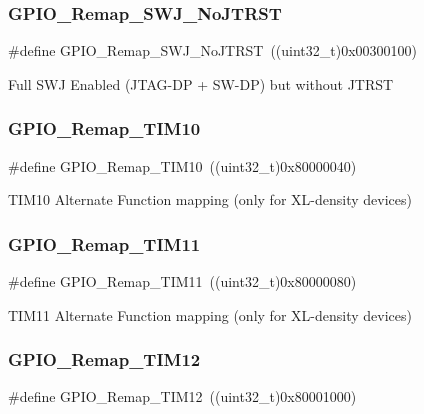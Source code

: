 \subsubsection{\texorpdfstring{GPIO\_Remap\_SWJ\_NoJTRST}{GPIO\_Remap\_SWJ\_NoJTRST}}
{\footnotesize\ttfamily \#define G\+P\+I\+O\+\_\+\+Remap\+\_\+\+S\+W\+J\+\_\+\+No\+J\+T\+R\+ST~((uint32\+\_\+t)0x00300100)}

Full S\+WJ Enabled (J\+T\+A\+G-\/\+DP + S\+W-\/\+DP) but without J\+T\+R\+ST \mbox{\label{group___g_p_i_o___remap__define_gac94252266a8fcb9ce7b55b5c55464110}} 
\subsubsection{\texorpdfstring{GPIO\_Remap\_TIM10}{GPIO\_Remap\_TIM10}}
{\footnotesize\ttfamily \#define G\+P\+I\+O\+\_\+\+Remap\+\_\+\+T\+I\+M10~((uint32\+\_\+t)0x80000040)}

T\+I\+M10 Alternate Function mapping (only for X\+L-\/density devices) \mbox{\label{group___g_p_i_o___remap__define_ga0f308f1bb45e4c473766603b4bef47f8}} 
\subsubsection{\texorpdfstring{GPIO\_Remap\_TIM11}{GPIO\_Remap\_TIM11}}
{\footnotesize\ttfamily \#define G\+P\+I\+O\+\_\+\+Remap\+\_\+\+T\+I\+M11~((uint32\+\_\+t)0x80000080)}

T\+I\+M11 Alternate Function mapping (only for X\+L-\/density devices) \mbox{\label{group___g_p_i_o___remap__define_ga44d3d86a684f62f9142d34ea5975a637}} 
\subsubsection{\texorpdfstring{GPIO\_Remap\_TIM12}{GPIO\_Remap\_TIM12}}
{\footnotesize\ttfamily \#define G\+P\+I\+O\+\_\+\+Remap\+\_\+\+T\+I\+M12~((uint32\+\_\+t)0x80001000)}

